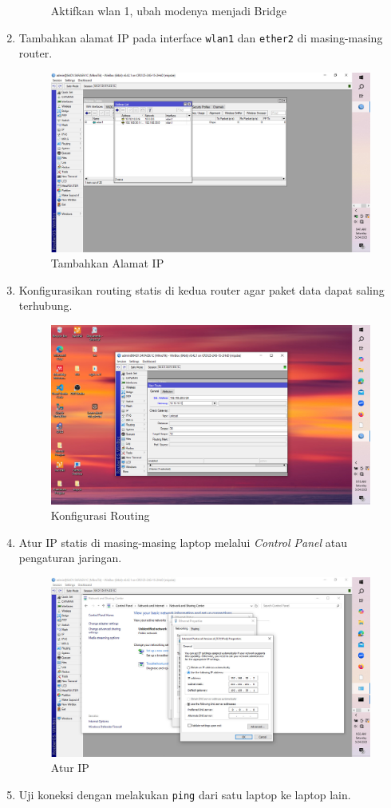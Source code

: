 \begin{enumerate}
\begin{figure}[H]
        \caption{Aktifkan wlan 1, ubah modenya menjadi Bridge}
        \label{fig:gambar4}
    \end{figure}
    \item Tambahkan alamat IP pada interface \texttt{wlan1} dan \texttt{ether2} di masing-masing router.
    \begin{figure}[H]
        \centering
        \includegraphics[width=0.5\linewidth]{P1/img/14.jpeg}
        \caption{Tambahkan Alamat IP}
        \label{fig:gambar4}
    \end{figure}
    \item Konfigurasikan routing statis di kedua router agar paket data dapat saling terhubung.
     \begin{figure}[H]
        \centering
        \includegraphics[width=0.5\linewidth]{P1/img/7.jpeg}
        \caption{Konfigurasi Routing}
        \label{fig:gambar4}
    \end{figure}
    \item Atur IP statis di masing-masing laptop melalui \textit{Control Panel} atau pengaturan jaringan.
     \begin{figure}[H]
        \centering
        \includegraphics[width=0.5\linewidth]{P1/img/9.jpeg}
        \caption{Atur IP}
        \label{fig:gambar4}
    \end{figure}
    \item Uji koneksi dengan melakukan \texttt{ping} dari satu laptop ke laptop lain.

\end{enumerate}
